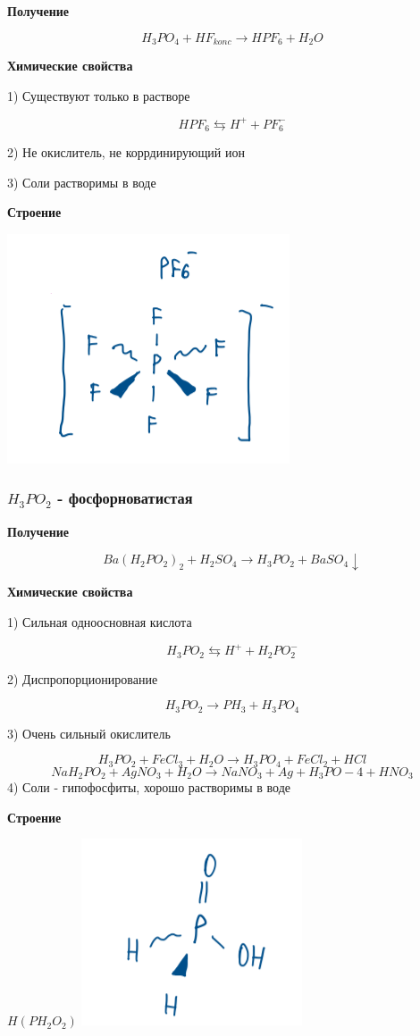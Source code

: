 \documentclass[14pt,a4paper]{scrartcl}
\begin{document}
\textbf{Получение}

$$H_3PO_4 + HF_{konc} \rightarrow HPF_6 + H_2O$$

\textbf{Химические свойства}

1) Существуют только в растворе

$$HPF_6 \leftrightarrows H^+ + PF_6^-$$

2) Не окислитель, не коррдинирующий ион

3) Соли растворимы в воде

\textbf{Строение}

\includegraphics{9v7.png}

\subsubsection{$H_3PO_2$ - фосфорноватистая}

\textbf{Получение}

$$Ba(H_2PO_2)_2 + H_2SO_4 \rightarrow H_3PO_2 + BaSO_4 \downarrow$$

\textbf{Химические свойства}

1) Сильная одноосновная кислота

$$H_3PO_2 \leftrightarrows H^+ + H_2PO_2^-$$

2) Диспропорционирование 

$$H_3PO_2 \rightarrow PH_3 + H_3PO_4$$

3) Очень сильный окислитель

$$H_3PO_2 + FeCl_3 + H_2O \rightarrow H_3PO_4 + FeCl_2 + HCl$$
$$NaH_2PO_2 + AgNO_3 + H_2O \rightarrow NaNO_3 + Ag + H_3PO-4 + HNO_3$$
4) Соли - гипофосфиты, хорошо растворимы в воде

\textbf{Строение}

$H(PH_2O_2)$
\includegraphics{9v8.png}
\end{document}
